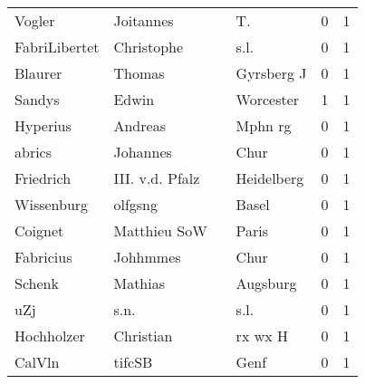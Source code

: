 \begin{tabular}{llllrr}
                   Vogler &                          Joitannes &             &                                         T.  &          0 &         1 \\
            FabriLibertet &                         Christophe &             &                                        s.l. &          0 &         1 \\
                  Blaurer &                             Thomas &             &                                  Gyrsberg J &          0 &         1 \\
                   Sandys &                              Edwin &             &                                   Worcester &          1 &         1 \\
                 Hyperius &                            Andreas &             &                                     Mphn rg &          0 &         1 \\
                   abrics &                           Johannes &             &                                        Chur &          0 &         1 \\
                Friedrich &                    III. v.d. Pfalz &             &                                  Heidelberg &          0 &         1 \\
               Wissenburg &                            olfgsng &             &                                       Basel &          0 &         1 \\
                  Coignet &                       Matthieu SoW &             &                                       Paris &          0 &         1 \\
                Fabricius &                           Johhmmes &             &                                        Chur &          0 &         1 \\
                   Schenk &                            Mathias &             &                                    Augsburg &          0 &         1 \\
                      uZj &                               s.n. &             &                                        s.l. &          0 &         1 \\
               Hochholzer &                          Christian &             &                                     rx wx H &          0 &         1 \\
                   CalVln &                             tifcSB &             &                                        Genf &          0 &         1 \\

\end{tabular}
